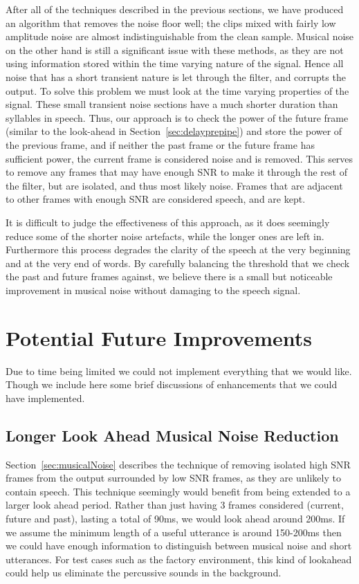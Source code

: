 \documentclass[11pt]{article} %
\begin{document}
{After all of the techniques described in the previous sections, we have produced an algorithm that removes the noise floor well; the clips mixed with fairly low amplitude noise are almost indistinguishable from the clean sample. Musical noise on the other hand is still a significant issue with these methods, as they are not using information stored within the time varying nature of the signal. Hence all noise that has a short transient nature is let through the filter, and corrupts the output.
To solve this problem we must look at the time varying properties of the signal. These small transient noise sections have a much shorter duration than syllables in speech. Thus, our approach is to check the power of the future frame (similar to the look-ahead in Section~\ref{sec:delayprepipe}) and store the power of the previous frame, and if neither the past frame or the future frame has sufficient power, the current frame is considered noise and is removed. This serves to remove any frames that may have enough SNR to make it through the rest of the filter, but are isolated, and thus most likely noise. Frames that are adjacent to other frames with enough SNR are considered speech, and are kept. 

It is difficult to judge the effectiveness of this approach, as it does seemingly reduce some of the shorter noise artefacts, while the longer ones are left in. 
Furthermore this process degrades the clarity of the speech at the very beginning and at the very end of words. By carefully balancing the threshold that we check the past and future frames against, we believe there is a small but noticeable improvement in musical noise without damaging to the speech signal. 

\section{Potential Future Improvements} 

Due to time being limited we could not implement everything that we would like. Though we include here some brief discussions of enhancements that we could have implemented. 

\subsection{Longer Look Ahead Musical Noise Reduction}
Section~\ref{sec:musicalNoise} describes the technique of removing isolated high SNR frames from the output surrounded by low SNR frames, as they are unlikely to contain speech. This technique seemingly would benefit from being extended to a larger look ahead period. Rather than just having 3 frames considered (current, future and past), lasting a total of 90ms, we would look ahead around 200ms.
If we assume the minimum length of a useful utterance is around 150-200ms then we could have enough information to distinguish between musical noise and short utterances. For test cases such as the factory environment, this kind of lookahead could help us eliminate the percussive sounds in the background. 

}
\end{document}
